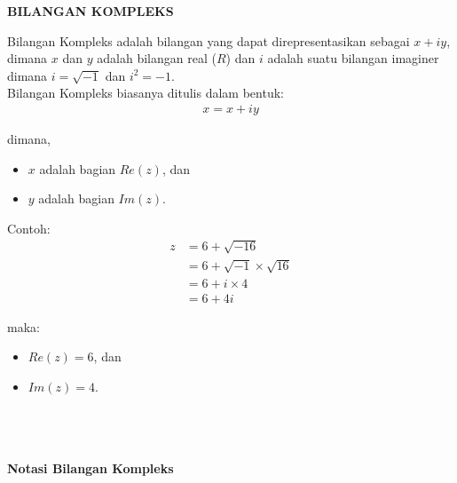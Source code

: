 \documentclass{article}
\begin{document}
    \begin{center}
        \textbf{BILANGAN KOMPLEKS}
    \end{center}

    Bilangan Kompleks adalah bilangan yang dapat direpresentasikan sebagai \( x + iy \), dimana $x$ dan $y$ adalah bilangan real ($R$) dan $i$ adalah suatu bilangan imaginer dimana \( i = \sqrt{-1} \) dan \( i^2 = -1 \).\\

    Bilangan Kompleks biasanya ditulis dalam bentuk:
    \begin{align}
        x = x + iy
    \end{align}

    \>dimana,
    \begin{itemize}
        \item $x$ adalah bagian $Re(z)$, dan
        \item $y$ adalah bagian $Im(z)$. \\
    \end{itemize}
    
    Contoh:
    \begin{align}
        z & = 6 + \sqrt{-16} 
        \nonumber\\
        & = 6 + \sqrt{-1} \times \sqrt{16}
        \nonumber\\
        & = 6 + i \times 4
        \nonumber\\
        & = 6 + 4i
    \end{align}

    maka:
    \begin{itemize}
        \item $Re(z) = 6$, dan
        \item $Im(z) = 4$. \\ \\ \\ \\
    \end{itemize}

    \newpage
    \begin{center}
        \textbf{Notasi Bilangan Kompleks}
    \end{center}
    
    \\ \\
\end{document}
